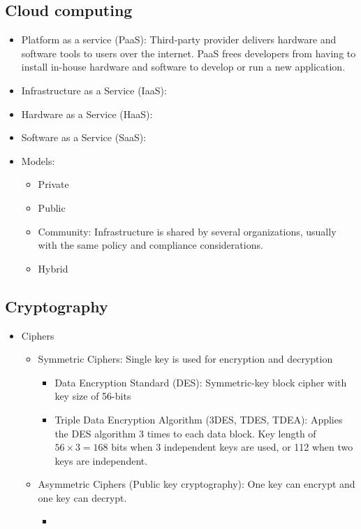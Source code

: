 \subsection{Cloud computing}
\begin{itemize}
    \item Platform as a service (PaaS): Third-party provider delivers hardware and software tools to users over the internet. PaaS frees developers from having to install in-house hardware and software to develop or run a new application.
    \item Infrastructure as a Service (IaaS):
    \item Hardware as a Service (HaaS):
    \item Software as a Service (SaaS):
    \item Models:
    \begin{itemize}
        \item Private
        \item Public
        \item Community: Infrastructure is shared by several organizations, usually with the same policy and compliance considerations.
        \item Hybrid
    \end{itemize}
\end{itemize}

\subsection{Cryptography}
\begin{itemize}
    \item Ciphers
    \begin{itemize}
        \item Symmetric Ciphers: Single key is used for encryption and decryption
        \begin{itemize}
            \item Data Encryption Standard (DES): Symmetric-key block cipher with key size of 56-bits
            \item Triple Data Encryption Algorithm (3DES, TDES, TDEA): Applies the DES algorithm 3 times to each data block. Key length of \(56 \times 3 = 168\) bits when 3 independent keys are used, or 112 when two keys are independent.
        \end{itemize}
        \item Asymmetric Ciphers (Public key cryptography): One key can encrypt and one key can decrypt.
        \begin{itemize}
            \item
        \end{itemize}
    \end{itemize}
\end{itemize}

